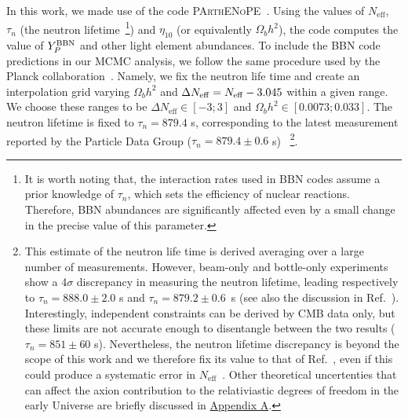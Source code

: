 \documentclass[fleqn,usenatbib,letters]{mnras}
\begin{document}
In this work, we made use of the code \textsc{PArthENoPE}~\citep{Gariazzo:2021iiu}. Using the values of $N_\mathrm{eff}$, $\tau_n$ (the neutron lifetime~\footnote{It is worth noting that, the interaction rates used in BBN codes assume a prior knowledge of $\tau_n$, which sets the efficiency of nuclear reactions. Therefore, BBN abundances are significantly affected even by a small change in the precise value of this parameter.}) and $\eta_{10}$ (or equivalently $\Omega_b h^2$), the code computes the value of $Y_P^{\rm BBN}$ and other light element abundances. To include the BBN code predictions in our MCMC analysis, we follow the same procedure used by the Planck collaboration~\citep{Aghanim:2018eyx}. Namely, we fix the neutron life time and create an interpolation grid varying $\Omega_b h^2 $ and $\Delta N_\mathrm{eff} = N_{\rm eff} - 3.045$ within a given range. We choose these ranges to be $\Delta N_\mathrm{eff} \in [-3 ; 3]$ and $\Omega_b h^2 \in [0.0073 ; 0.033]$. The neutron lifetime is fixed to $\tau_n = 879.4$ s, corresponding to the latest measurement reported by the Particle Data Group ($\tau_n = 879.4 \pm 0.6 $ s)~\citep{ParticleDataGroup:2020ssz} \footnote{This estimate of the neutron life time is derived averaging over a large number of measurements. However, beam-only and bottle-only experiments show a 4$\sigma $ discrepancy in measuring the neutron lifetime, leading respectively to $\tau_n = 888.0 \pm 2.0 $ s  and $\tau_n = 879.2 \pm 0.6$~s  (see also the discussion in Ref.~\citep{Salvati:2015wxa}). Interestingly, independent constraints can be derived by  CMB data only, but these limits are not accurate enough to disentangle between the two results ($\tau_n = 851 \pm 60$ s). Nevertheless, the neutron lifetime discrepancy is beyond the scope of this work and we therefore fix its value to that of Ref.~\citep{ParticleDataGroup:2020ssz}, even if this could produce a systematic error in $N_\mathrm{eff}$~\citep{Capparelli:2017tyx}. Other theoretical uncertenties that can affect the axion contribution to the relativiastic degrees of freedom in the early Universe are briefly discussed in \hyperref[AppendixA]{Appendix A}.}.
\end{document}
